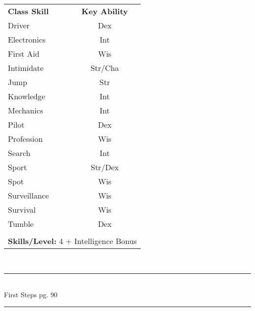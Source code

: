 \begin{table}[htb]
\raggedright
\begin{tabular}{l c}
\textbf{Class Skill} & \textbf{Key Ability}\\

Driver & Dex\\
Electronics & Int\\
First Aid & Wis\\
Intimidate & Str/Cha\\
Jump & Str\\
Knowledge & Int\\
Mechanics & Int\\
Pilot & Dex\\
Profession & Wis\\
Search & Int\\
Sport & Str/Dex\\
Spot & Wis\\
Surveillance & Wis\\
Survival & Wis\\
Tumble& Dex\\

\multicolumn{2}{l}{\cellcolor{white}}\\
\multicolumn{2}{l}{\cellcolor{white}\textbf{Skills/Level:} 4 + Intelligence Bonus}\\
\end{tabular}
\end{table}

\setlength{\intextsep}{14.0pt plus 4.0pt minus 4.0pt}

\vspace*{3cm}

\vspace*{\fill}

\begin{center}
\textsc{\Large}\\[0.25cm]
\rule{\linewidth}{0.5mm}\\[0.6cm]
\fontsize{30}{30} \selectfont First Steps pg. 90\\
\rule{\linewidth}{0.5mm}\\[0.6cm]
\vfill
\end{center}

\pagebreak



